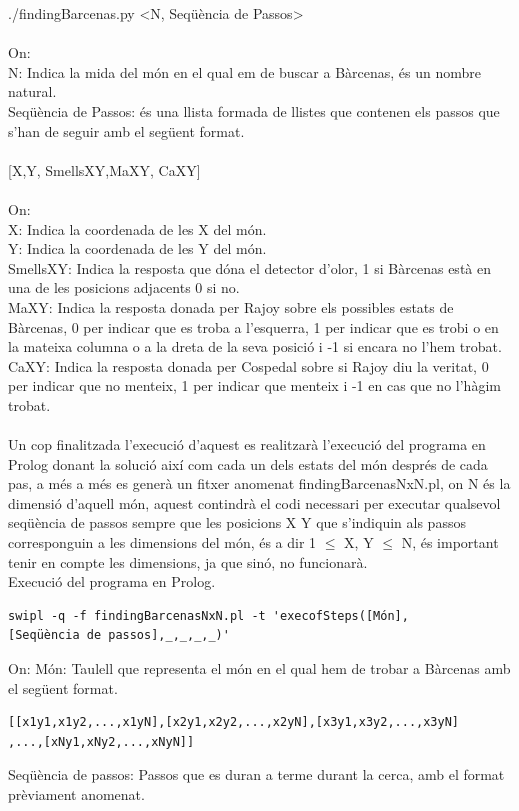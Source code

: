 \documentclass[11pt]{article}
\begin{document}
./findingBarcenas.py \textless N, Seqüència de Passos\textgreater \\\\
On:\\
N: Indica la mida del món en el qual em de buscar a Bàrcenas, és un nombre natural.\\
Seqüència de Passos: és una llista formada de llistes que contenen els passos que s'han de seguir amb el següent format.\\\\

[X,Y, SmellsXY,MaXY, CaXY]\\\\
On:\\
X: Indica la coordenada de les X del món.\\
Y: Indica la coordenada de les Y del món.\\
SmellsXY: Indica la resposta que dóna el detector d'olor, 1 si Bàrcenas està en una de les posicions adjacents 0 si no.\\
MaXY: Indica la resposta donada per Rajoy sobre els possibles estats de Bàrcenas, 0 per indicar que es troba a l'esquerra, 1 per indicar que es trobi o en la mateixa columna o a la dreta de la seva posició i -1 si encara no l'hem trobat.\\
CaXY: Indica la resposta donada per Cospedal sobre si Rajoy diu la veritat, 0 per indicar que no menteix, 1 per indicar que menteix i -1 en cas que no l'hàgim trobat.\\\\
Un cop finalitzada l'execució d'aquest es realitzarà l'execució del programa en Prolog donant la solució així com cada un dels estats del món després de cada pas, a més a més es generà un fitxer anomenat findingBarcenasNxN.pl, on N és la dimensió d'aquell món, aquest contindrà el codi necessari per executar qualsevol seqüència de passos sempre que les posicions X Y que s'indiquin als passos corresponguin a les dimensions del món, és a dir 1 $\leq$ X, Y $\leq$ N, és important tenir en compte les dimensions, ja que sinó, no funcionarà.\\
Execució del programa en Prolog.\\
\begin{verbatim}
swipl -q -f findingBarcenasNxN.pl -t 'execofSteps([Món],
[Seqüència de passos],_,_,_,_)'
\end{verbatim}
On:
Món: Taulell que representa el món en el qual hem de trobar a Bàrcenas amb el següent format.\\
\begin{verbatim}
[[x1y1,x1y2,...,x1yN],[x2y1,x2y2,...,x2yN],[x3y1,x3y2,...,x3yN]
,...,[xNy1,xNy2,...,xNyN]]
\end{verbatim}
Seqüència de passos: Passos que es duran a terme durant la cerca, amb el format prèviament anomenat.
\end{document}
